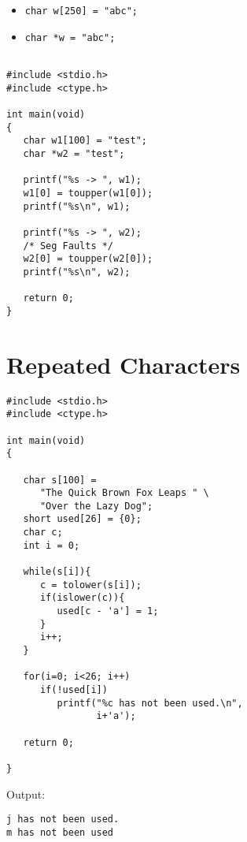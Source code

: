 \newpage
{\samepage
\begin{itemize}
\item \begin{verbatim}
char w[250] = "abc";
\end{verbatim}
\item \begin{verbatim}
char *w = "abc";
\end{verbatim}
\end{itemize}
\begin{verbatim}

#include <stdio.h>
#include <ctype.h>

int main(void)
{
   char w1[100] = "test";
   char *w2 = "test";

   printf("%s -> ", w1);
   w1[0] = toupper(w1[0]);
   printf("%s\n", w1);

   printf("%s -> ", w2);
   /* Seg Faults */
   w2[0] = toupper(w2[0]);
   printf("%s\n", w2);

   return 0;
}
\end{verbatim}
}

\newpage
{\samepage
\section*{Repeated Characters}
{\small
\begin{verbatim}
#include <stdio.h>
#include <ctype.h>

int main(void)
{

   char s[100] =
      "The Quick Brown Fox Leaps " \
      "Over the Lazy Dog";
   short used[26] = {0};
   char c;
   int i = 0;

   while(s[i]){
      c = tolower(s[i]);
      if(islower(c)){
         used[c - 'a'] = 1;
      }
      i++;
   }

   for(i=0; i<26; i++)
      if(!used[i])
         printf("%c has not been used.\n",
                i+'a');

   return 0;

}
\end{verbatim}

Output:
\begin{verbatim}
j has not been used.
m has not been used
\end{verbatim}
}
}


\newpage
